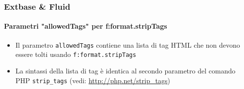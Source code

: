 
\begin{frame}[fragile]
	\frametitle{Extbase \& Fluid}
	\framesubtitle{Parametri "allowedTags" per f:format.stripTags}

	\begin{itemize}

		\item Il parametro \texttt{allowedTags} contiene una lista di tag HTML 
			che non devono essere tolti usando \texttt{f:format.stripTags}

		\item La sintassi della lista di tag è identica al secondo parametro del comando PHP
			\texttt{strip\_tags} (vedi: \url{http://php.net/strip_tags})

	\end{itemize}

\end{frame}


